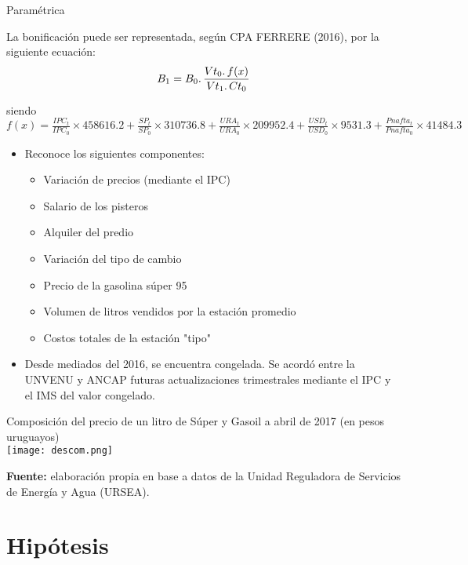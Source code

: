 \documentclass[10pt]{beamer}
\begin{document}
\begin{frame}[allowframebreaks]{Paramétrica}

La bonificación puede ser representada, según CPA FERRERE (2016), por la siguiente ecuación:
$$ B_1=B_0\ldotp \frac{Vt_0\ldotp f(x)}{Vt_1 \ldotp Ct_0} $$

siendo $f(x) = \frac{IPC_t}{IPC_0}\times 458616.2 + \frac{SP_t}{SP_0}\times310736.8 + \frac{URA_t}{URA_0}\times 209952.4 + \frac{USD_t}{USD_0}\times 9531.3 + \frac{Pnafta_t}{Pnafta_0}\times 41484.3$

\begin{itemize}
\item Reconoce los siguientes componentes:
	\begin{itemize}
	\item Variación de precios (mediante el IPC)
	\item Salario de los pisteros
	\item Alquiler del predio
	\item Variación del tipo de cambio
	\item Precio de la gasolina súper 95
	\item Volumen de litros vendidos por la estación promedio
	\item Costos totales de la estación "tipo"
	\end{itemize}
\end{itemize}

\begin{itemize}
\item Desde mediados del 2016, se encuentra congelada. Se acordó entre la UNVENU y ANCAP futuras actualizaciones trimestrales mediante el IPC y el IMS del valor congelado.
\end{itemize}

\framebreak

\begin{center}
Composición del precio de un litro de Súper y Gasoil a abril de 2017 (en pesos uruguayos) \\
\texttt{[image: descom.png]} 
\end{center}
\FloatBarrier
\noindent\textbf{Fuente:} elaboración propia en base a datos de la Unidad Reguladora de Servicios de Energía y Agua (URSEA).

\end{frame}


\section{Hipótesis}
\end{document}
